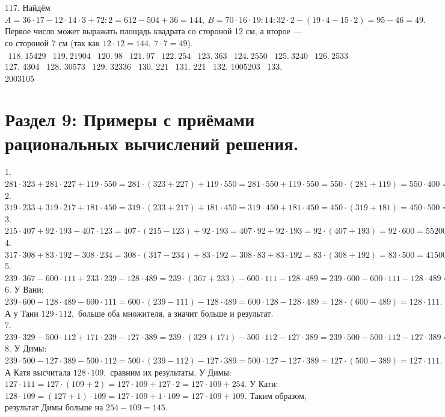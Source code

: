 \documentclass[12pt]{article}
\begin{document}
117. Найдём $A=36\cdot17-12\cdot14\cdot3+72:2=612-504+36=144,\ B=70\cdot16\cdot19:14:32\cdot2-(19\cdot4-15\cdot2)=95-46=49.$ Первое число может выражать площадь квадрата со стороной 12 см, а второе --- со стороной 7 см (так как $12\cdot12=144,\ 7\cdot7=49$).\\
$\begin{array}{lllllllllllll}
118.\ 15429& 119.\ 21904& 120.\ 98& 121.\ 97& 122.\ 254& 123.\ 363 & 124.\ 2550 & 125.\ 3240 & 126.\ 2533 \end{array}$\\
127. 4304 \ 128. 30573 \ 129. 32336 \ 130. 221 \ 131. 221 \ 132. 1005203 \ 133. 2003105
\newpage
\section{Раздел 9: Примеры с приёмами рациональных вычислений решения.}
1.$281\cdot323+281\cdot227+119\cdot550=281\cdot(323+227)+119\cdot550=281\cdot550+119\cdot550=550\cdot(281+119)=550\cdot400=220000.$\\
2.$319\cdot233+319\cdot217+181\cdot450=319\cdot(233+217)+181\cdot450=319\cdot450+181\cdot450=450\cdot(319+181)=450\cdot500=225000.$\\
3.$215\cdot407+92\cdot193-407\cdot123=407\cdot(215-123)+92\cdot193=407\cdot92+92\cdot193=92\cdot(407+193)=92\cdot600=55200.$\\
4.$317\cdot308+83\cdot192-308\cdot234=308\cdot(317-234)+83\cdot192=308\cdot83+83\cdot192=83\cdot(308+192)=83\cdot500=41500.$\\
5.$239\cdot367-600\cdot111+233\cdot239-128\cdot489=239\cdot(367+233)-600\cdot111-128\cdot489=239\cdot600-600\cdot111-128\cdot489=600\cdot(239-111)-128\cdot489=600\cdot128-
128\cdot489=128\cdot(600-489)=128\cdot111=14208.$\\
6. У Вани: $239\cdot600-128\cdot489-600\cdot111=600\cdot(239-111)-128\cdot489=600\cdot128-128\cdot489=128\cdot(600-489)=128\cdot111.$ А у Тани $129\cdot112,$ больше оба множителя, а значит больше и результат.\\
7. $239\cdot329-500\cdot112+171\cdot239-127\cdot389=239\cdot(329+171)-500\cdot112-127\cdot389=239\cdot500-500\cdot112-127\cdot389=500\cdot(239-112)-127\cdot389=
500\cdot127-127\cdot389=127\cdot(500-389)=127\cdot111=14097.$\\
8. У Димы: $239\cdot500-127\cdot389-500\cdot112=500\cdot(239-112)-127\cdot389=500\cdot127-127\cdot389=127\cdot(500-389)=127\cdot111.$ А Катя высчитала $128\cdot109,$ сравним их результаты. У Димы: $127\cdot111=127\cdot(109+2)=127\cdot109+127\cdot2=127\cdot109+254.$ У Кати: $128\cdot109=(127+1)\cdot109=127\cdot109+1\cdot109=127\cdot109+109.$ Таким образом, результат Димы больше на $254-109=145.$\\
\end{document}
